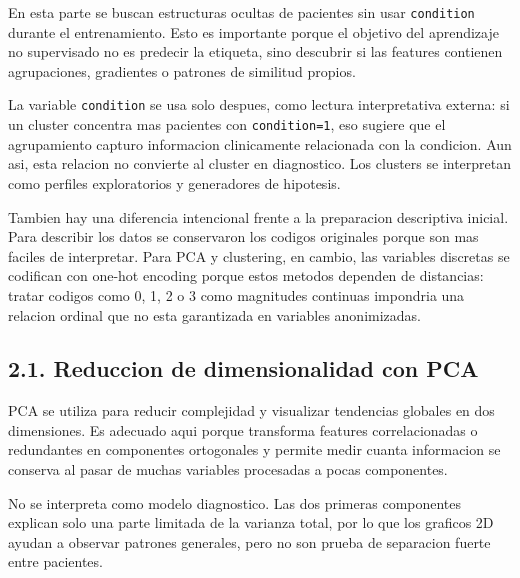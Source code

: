 \documentclass[11pt]{article}
\begin{document}
En esta parte se buscan estructuras ocultas de pacientes sin usar
\texttt{condition} durante el entrenamiento. Esto es importante porque
el objetivo del aprendizaje no supervisado no es predecir la etiqueta,
sino descubrir si las features contienen agrupaciones, gradientes o
patrones de similitud propios.

La variable \texttt{condition} se usa solo despues, como lectura
interpretativa externa: si un cluster concentra mas pacientes con
\texttt{condition=1}, eso sugiere que el agrupamiento capturo
informacion clinicamente relacionada con la condicion. Aun asi, esta
relacion no convierte al cluster en diagnostico. Los clusters se
interpretan como perfiles exploratorios y generadores de hipotesis.

Tambien hay una diferencia intencional frente a la preparacion
descriptiva inicial. Para describir los datos se conservaron los codigos
originales porque son mas faciles de interpretar. Para PCA y clustering,
en cambio, las variables discretas se codifican con one-hot encoding
porque estos metodos dependen de distancias: tratar codigos como 0, 1, 2
o 3 como magnitudes continuas impondria una relacion ordinal que no esta
garantizada en variables anonimizadas.

    \subsection{2.1. Reduccion de dimensionalidad con
PCA}\label{reduccion-de-dimensionalidad-con-pca}

PCA se utiliza para reducir complejidad y visualizar tendencias globales
en dos dimensiones. Es adecuado aqui porque transforma features
correlacionadas o redundantes en componentes ortogonales y permite medir
cuanta informacion se conserva al pasar de muchas variables procesadas a
pocas componentes.

No se interpreta como modelo diagnostico. Las dos primeras componentes
explican solo una parte limitada de la varianza total, por lo que los
graficos 2D ayudan a observar patrones generales, pero no son prueba de
separacion fuerte entre pacientes.
\end{document}
